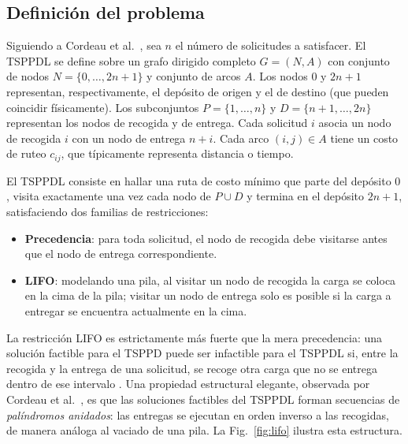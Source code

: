 \documentclass[conference]{IEEEtran}
\begin{document}
\subsection{Definición del problema}
Siguiendo a Cordeau et al.\ \cite{cordeau2010}, sea $n$ el número de solicitudes a satisfacer. El TSPPDL se define sobre un grafo dirigido completo $G=(N,A)$ con conjunto de nodos $N=\{0,\dots,2n+1\}$ y conjunto de arcos $A$. Los nodos $0$ y $2n+1$ representan, respectivamente, el depósito de origen y el de destino (que pueden coincidir físicamente). Los subconjuntos $P=\{1,\dots,n\}$ y $D=\{n+1,\dots,2n\}$ representan los nodos de recogida y de entrega. Cada solicitud $i$ asocia un nodo de recogida $i$ con un nodo de entrega $n+i$. Cada arco $(i,j)\in A$ tiene un costo de ruteo $c_{ij}$, que típicamente representa distancia o tiempo.

El TSPPDL consiste en hallar una ruta de costo mínimo que parte del depósito $0$, visita exactamente una vez cada nodo de $P\cup D$ y termina en el depósito $2n+1$, satisfaciendo dos familias de restricciones:

\begin{itemize}
\item \textbf{Precedencia}: para toda solicitud, el nodo de recogida debe visitarse antes que el nodo de entrega correspondiente.
\item \textbf{LIFO}: modelando una pila, al visitar un nodo de recogida la carga se coloca en la cima de la pila; visitar un nodo de entrega solo es posible si la carga a entregar se encuentra actualmente en la cima.
\end{itemize}

La restricción LIFO es estrictamente más fuerte que la mera precedencia: una solución factible para el TSPPD puede ser infactible para el TSPPDL si, entre la recogida y la entrega de una solicitud, se recoge otra carga que no se entrega dentro de ese intervalo \cite{cordeau2010,li2011}. Una propiedad estructural elegante, observada por Cordeau et al.\ \cite{cordeau2010}, es que las soluciones factibles del TSPPDL forman secuencias de \textit{palíndromos anidados}: las entregas se ejecutan en orden inverso a las recogidas, de manera análoga al vaciado de una pila. La Fig.~\ref{fig:lifo} ilustra esta estructura.
\end{document}
